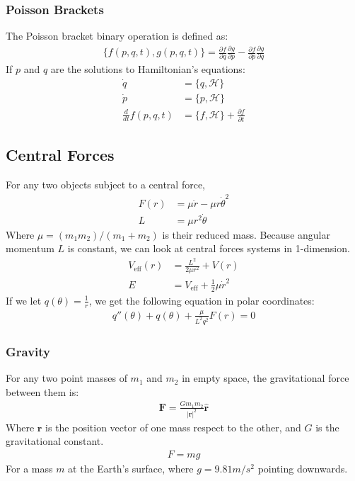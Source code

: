 \documentclass[11pt, letterpaper]{article}
\newcommand{\Hami}{\mathcal{H}}	       %
\newcommand{\ve}[1]{
  \ensuremath{\bm{#1}}}	               %
\newcommand{\uve}[1]{
  \ensuremath{\bm{\hat{#1}}}}          %
\newcommand{\pd}[2]{
  \ensuremath{
    \frac{\partial #1}{\partial #2} }} %
\begin{document}
\begin{multicols*}{3}
\subsubsection{Poisson Brackets}
The Poisson bracket binary operation is defined as:
\begin{align*}
  \{ f(p, q, t), g(p, q, t) \} = \pd{f}{q}\pd{g}{p} - \pd{f}{p}\pd{g}{q}
\end{align*}
If $p$ and $q$ are the solutions to Hamiltonian's equations:
\begin{align*}
  \dot{q} &= \{q, \Hami \} \\
  \dot{p} &= \{p, \Hami \} \\
  \frac{d}{dt} f(p, q, t) &= \{f, \Hami\} + \pd{f}{t}
\end{align*}
\subsection{Central Forces}
For any two objects subject to a central force,
\begin{align*}
  F(r) &= \mu \ddot{r} - \mu r \dot{\theta}^2\\
  L &= \mu r^2\dot{\theta}
\end{align*}
Where $\mu = (m_1 m_2)/(m_1 + m_2)$ is their reduced mass. Because angular
momentum $L$ is constant, we can look at central forces systems in 1-dimension.
\begin{align*}
  V_{\text{eff}}(r) &= \frac{L^2}{2 \mu r^2} + V(r) \\
  E &= V_{\text{eff}} + \frac{1}{2} \mu \dot{r}^2
\end{align*}
If we let $q(\theta) = \frac{1}{r}$, we get the following equation in polar
coordinates:
\begin{align*}
  q''(\theta) + q(\theta) + \frac{\mu}{L^2 q^2} F(r) = 0
\end{align*}
\subsubsection{Gravity}
For any two point masses of $m_1$ and $m_2$ in empty space, the gravitational
force between them is:
\begin{align*}
  \ve{F}=\frac{Gm_1m_2}{|\ve{r}|^2}\uve{r}
\end{align*}
Where $\ve{r}$ is the position vector of one mass respect to the other, and $G$
is the gravitational constant.
\begin{align*}
  F=mg
\end{align*}
\noindent For a mass $m$ at the Earth's surface, where $g=9.81m/s^2$ pointing
downwards.

\end{multicols*}
\end{document}
